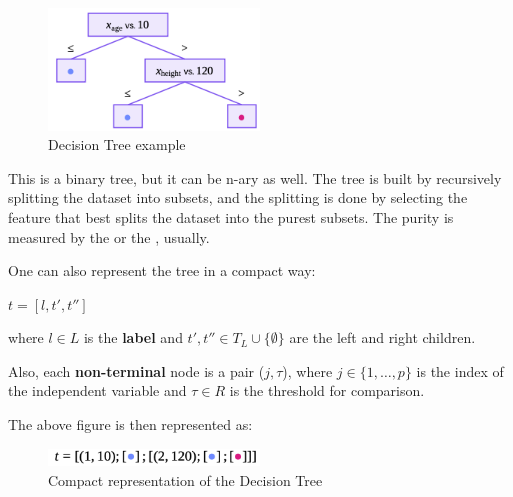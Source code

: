 \begin{center}
    \begin{figure}[H]
        \centering
        \includegraphics[width=0.5\textwidth]{assets/fig11.png}
        \caption{Decision Tree example}
    \end{figure}
\end{center}

This is a binary tree, but it can be n-ary as well. The tree is built by recursively splitting the dataset into subsets, and the splitting is done by selecting the feature that best splits the dataset into the purest subsets. The purity is measured by the  or the , usually.

One can also represent the tree in a compact way:
\begin{center}
    $t = [l, t', t'']$
\end{center}

where $l \in L$ is the \textbf{label} and $t', t'' \in T_L \cup \{\emptyset\}$ are the left and right children.

Also, each \textbf{non-terminal} node is a pair ($j, \tau$), where $j \in \{1, \dots, p\}$ is the index of the independent variable and $\tau \in R$ is the threshold for comparison.

The above figure is then represented as:

\begin{center}
    \begin{figure}[H]
        \centering
        \includegraphics[width=0.5\textwidth]{assets/fig12.png}
        \caption{Compact representation of the Decision Tree}
    \end{figure}
\end{center}


